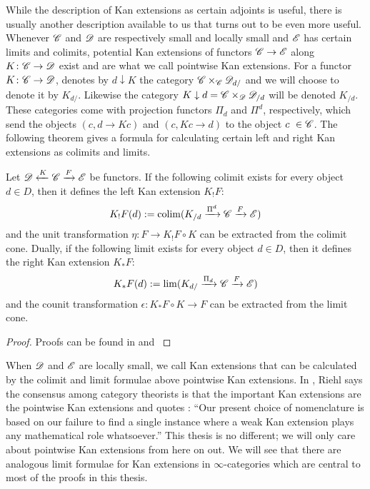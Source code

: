 \documentclass[../../thesis.tex]{subfiles}
\begin{document}
While the description of Kan extensions as certain adjoints is useful, there is usually another description available to us that turns out to be even more useful.
Whenever $\mathscr{C}$ and $\mathscr{D}$ are respectively small and locally small and $\mathscr{E}$ has certain limits and colimits, potential Kan extensions of functors $\mathscr{C} \to \mathscr{E}$ along $K\colon \mathscr{C} \to \mathscr{D}$ exist and are what we call pointwise Kan extensions.
For a functor $K\colon \mathscr{C} \to \mathscr{D}$, \cite{MacLane} denotes by $d \downarrow K$ the category $\mathscr{C} \times_{\mathscr{C}}\mathscr{D}_{d/}$ and we will choose to denote it by $K_{d/}$.
Likewise the category $K \downarrow d = \mathscr{C} \times_{\mathscr{D}}\mathscr{D}_{/d}$ will be denoted $K_{/d}$.
These categories come with projection functors $\Pi_d$ and $\Pi^d$, respectively, which send the objects $(c,d\to Kc)$ and $(c,Kc \to d)$ to the object $c \in \C$.
The following theorem gives a formula for calculating certain left and right Kan extensions as colimits and limits.
\begin{theorem}\label{ptwiseKan}
    Let $\mathscr{D} \xleftarrow{K} \mathscr{C} \xrightarrow{F} \mathscr{E}$ be functors.
    If the following colimit exists for every object $d\in D$, then it defines the left Kan extension $K_!F$:
    \[
        K_!F(d) : = \operatorname{colim}(K_{/d} \xrightarrow{\Pi^d}\mathscr{C}\xrightarrow{F}\mathscr{E})
    \]
    and the unit transformation $\eta\colon F \to K_!F\circ K$ can be extracted from the colimit cone.
    Dually, if the following limit exists for every object $d\in D$, then it defines the right Kan extension $K_*F$:
    \[
        K_*F(d) : = \lim(K_{d/} \xrightarrow{\Pi_d}\mathscr{C} \xrightarrow{F} \mathscr{E})
    \]
    and the counit transformation $\epsilon\colon K_*F\circ K \to F$ can be extracted from the limit cone.
\end{theorem}
\begin{proof}
    Proofs can be found in \cite[Theorem 6.2.1.]{CatContext} and \cite[Theorem X.3.1.]{MacLane}
\end{proof}
When $\mathscr{D}$ and $\mathscr{E}$ are locally small, we call Kan extensions that can be calculated by the colimit and limit formulae above pointwise Kan extensions.
In \cite{CatContext}, Riehl says the consensus among category theorists is that the important Kan extensions are the pointwise Kan extensions and quotes \cite[§4]{Kelly}:
``Our present choice of nomenclature is based on our failure to find a single instance where a weak Kan extension plays any mathematical role whatsoever.''
This thesis is no different; we will only care about pointwise Kan extensions from here on out.
We will see that there are analogous limit formulae for Kan extensions in $\infty$-categories which are central to most of the proofs in this thesis.
\end{document}
